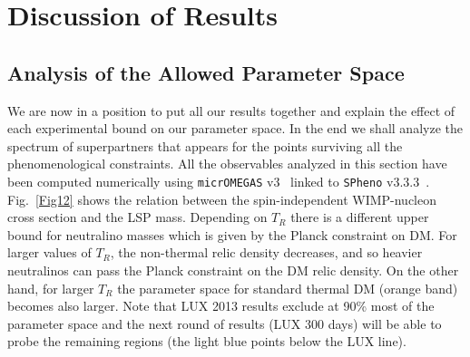 \documentclass[12pt,a4paper]{book}
\begin{document}
\section{Discussion of Results}\vspace{-0.1cm}
\label{ssec:DiscussionResults}

\subsection{Analysis of the Allowed Parameter Space}\vspace{-0.1cm}
We are now in a position to put all our results together and explain the effect of each experimental bound on our parameter space. In the end we shall analyze the spectrum of superpartners that appears for the points surviving all the phenomenological constraints. All the observables analyzed in this section have been computed numerically using \verb"micrOMEGAS" v3~\cite{Belanger:2013oya} linked to \verb"SPheno" v3.3.3~\cite{Porod:2003um, Porod:2011nf}.\\

Fig.~\ref{Fig12} shows the relation between the spin-independent WIMP-nucleon cross section and the LSP mass. Depending on $T_R$ there is a different upper bound for neutralino masses which is given by the Planck constraint on DM. For larger values of $T_R$, the non-thermal relic density decreases, and so heavier neutralinos can pass the Planck constraint on the DM relic density. On the other hand, for larger $T_R$ the parameter space for standard thermal DM (orange band) becomes also larger. Note that LUX 2013 results exclude at 90\% most of the parameter space and the next round of results (LUX 300 days) will be able to probe the remaining regions (the light blue points below the LUX line).\\
\end{document}
